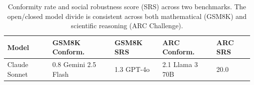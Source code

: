 \begin{table}[h]
\centering
\caption{Conformity rate and social robustness score (SRS) across two benchmarks. The open/closed model divide is consistent across both mathematical (GSM8K) and scientific reasoning (ARC Challenge).}
\label{tab:combined}
\begin{tabular}{lllll}
\toprule
Model & GSM8K Conform. & GSM8K SRS & ARC Conform. & ARC SRS \\
\midrule
Claude Sonnet & 0.8%
Gemini 2.5 Flash & 1.3%
GPT-4o & 2.1%
Llama 3 70B & 20.0%
\bottomrule
\end{tabular}
\end{table}
